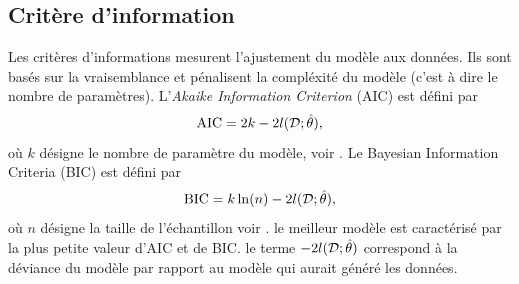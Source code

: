 \subsection{Critère d'information}
Les critères d'informations mesurent l'ajustement du modèle aux données. Ils sont basés sur la vraisemblance et pénalisent la compléxité du modèle (c'est à dire le nombre de paramètres). L'\textit{Akaike Information Criterion} (AIC) est défini par 
$$
\text{AIC} = 2k - 2 l(\mathcal{D};\hat{\theta}),
$$
où $k$ désigne le nombre de paramètre du modèle, voir \citet{Akaike1998}. Le Bayesian Information Criteria (BIC) est défini par 
$$
\text{BIC} = k\ln(n) - 2 l(\mathcal{D};\hat{\theta}),
$$
où $n$ désigne la taille de l'échantillon voir \citet{Schwarz1978}. le meilleur modèle est caractérisé par la plus petite valeur d'AIC et de BIC. le terme $- 2 l(\mathcal{D};\hat{\theta})$ correspond à la déviance du modèle par rapport au modèle qui aurait généré les données. 
